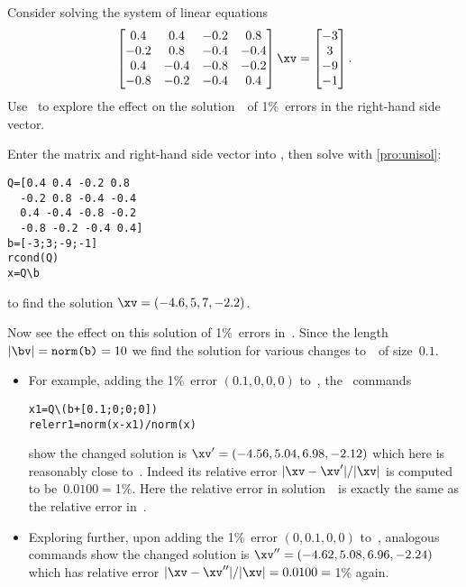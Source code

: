 \begin{example} \label{eg:} 
Consider solving the system of linear equations
\begin{equation*}
\begin{bmatrix} 0.4&0.4&-0.2&0.8
\\-0.2&0.8&-0.4&-0.4
\\0.4&-0.4&-0.8&-0.2
\\-0.8&-0.2&-0.4&0.4 \end{bmatrix}\xv
=\begin{bmatrix} -3\\3\\-9\\-1 \end{bmatrix}.
\end{equation*}
Use \script\ to explore the effect on the solution~\xv\ of 1\%~errors in the right-hand side vector.
\begin{solution} 
Enter the matrix and right-hand side vector into \script, then solve  with \autoref{pro:unisol}:
\setbox\ajrqrbox\hbox{}%
\marginpar{\usebox{\ajrqrbox\\[2ex]}}%
\begin{verbatim}
Q=[0.4 0.4 -0.2 0.8
  -0.2 0.8 -0.4 -0.4
  0.4 -0.4 -0.8 -0.2
  -0.8 -0.2 -0.4 0.4]
b=[-3;3;-9;-1]
rcond(Q)
x=Q\b
\end{verbatim}
to find the solution \(\xv=(-4.6,5,7,-2.2)\).

Now see the effect on this solution of 1\%~errors in~\bv.
Since the length \(|\bv|=\verb|norm(b)|=10\) we find the solution for various changes to~\bv\ of size~\(0.1\).
\begin{itemize}
\item For example, adding the 1\%~error \((0.1,0,0,0)\) to~\bv, the \script\ commands
\begin{verbatim}
x1=Q\(b+[0.1;0;0;0])
relerr1=norm(x-x1)/norm(x)
\end{verbatim}
show the changed solution is \(\xv'=(-4.56,5.04,6.98,-2.12)\) which here is reasonably close to~\xv.
Indeed its relative error \(|\xv-\xv'|/|\xv|\) is computed to be~\(0.0100={}\)1\%.
Here the relative error in solution~\xv\ is exactly the same as the relative error in~\bv.

\item Exploring further, upon adding the 1\%~error \((0,0.1,0,0)\) to~\bv, analogous commands show the changed solution is \(\xv''=(-4.62,5.08,6.96,-2.24)\) which has relative error \(|\xv-\xv''|/|\xv|=0.0100={}\)1\% again.


\end{itemize}
\end{solution}
\end{example}
